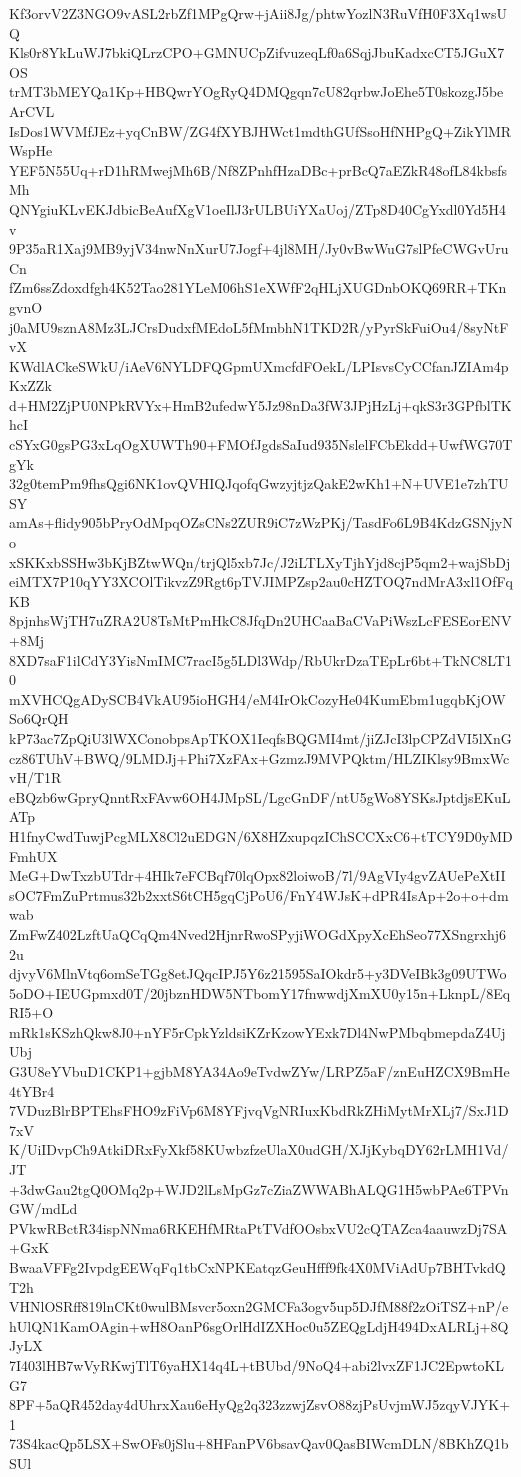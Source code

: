 Kf3orvV2Z3NGO9vASL2rbZf1MPgQrw+jAii8Jg/phtwYozlN3RuVfH0F3Xq1wsUQ
Kls0r8YkLuWJ7bkiQLrzCPO+GMNUCpZifvuzeqLf0a6SqjJbuKadxcCT5JGuX7OS
trMT3bMEYQa1Kp+HBQwrYOgRyQ4DMQgqn7cU82qrbwJoEhe5T0skozgJ5beArCVL
IsDos1WVMfJEz+yqCnBW/ZG4fXYBJHWct1mdthGUfSsoHfNHPgQ+ZikYlMRWspHe
YEF5N55Uq+rD1hRMwejMh6B/Nf8ZPnhfHzaDBc+prBcQ7aEZkR48ofL84kbsfsMh
QNYgiuKLvEKJdbicBeAufXgV1oeIlJ3rULBUiYXaUoj/ZTp8D40CgYxdl0Yd5H4v
9P35aR1Xaj9MB9yjV34nwNnXurU7Jogf+4jl8MH/Jy0vBwWuG7slPfeCWGvUruCn
fZm6ssZdoxdfgh4K52Tao281YLeM06hS1eXWfF2qHLjXUGDnbOKQ69RR+TKngvnO
j0aMU9sznA8Mz3LJCrsDudxfMEdoL5fMmbhN1TKD2R/yPyrSkFuiOu4/8syNtFvX
KWdlACkeSWkU/iAeV6NYLDFQGpmUXmcfdFOekL/LPIsvsCyCCfanJZIAm4pKxZZk
d+HM2ZjPU0NPkRVYx+HmB2ufedwY5Jz98nDa3fW3JPjHzLj+qkS3r3GPfblTKhcI
cSYxG0gsPG3xLqOgXUWTh90+FMOfJgdsSaIud935NslelFCbEkdd+UwfWG70TgYk
32g0temPm9fhsQgi6NK1ovQVHIQJqofqGwzyjtjzQakE2wKh1+N+UVE1e7zhTUSY
amAs+flidy905bPryOdMpqOZsCNs2ZUR9iC7zWzPKj/TasdFo6L9B4KdzGSNjyNo
xSKKxbSSHw3bKjBZtwWQn/trjQl5xb7Jc/J2iLTLXyTjhYjd8cjP5qm2+wajSbDj
eiMTX7P10qYY3XCOlTikvzZ9Rgt6pTVJIMPZsp2au0cHZTOQ7ndMrA3xl1OfFqKB
8pjnhsWjTH7uZRA2U8TsMtPmHkC8JfqDn2UHCaaBaCVaPiWszLcFESEorENV+8Mj
8XD7saF1ilCdY3YisNmIMC7racI5g5LDl3Wdp/RbUkrDzaTEpLr6bt+TkNC8LT10
mXVHCQgADySCB4VkAU95ioHGH4/eM4IrOkCozyHe04KumEbm1ugqbKjOWSo6QrQH
kP73ac7ZpQiU3lWXConobpsApTKOX1IeqfsBQGMI4mt/jiZJcI3lpCPZdVI5lXnG
cz86TUhV+BWQ/9LMDJj+Phi7XzFAx+GzmzJ9MVPQktm/HLZIKlsy9BmxWcvH/T1R
eBQzb6wGpryQnntRxFAvw6OH4JMpSL/LgcGnDF/ntU5gWo8YSKsJptdjsEKuLATp
H1fnyCwdTuwjPcgMLX8Cl2uEDGN/6X8HZxupqzIChSCCXxC6+tTCY9D0yMDFmhUX
MeG+DwTxzbUTdr+4HIk7eFCBqf70lqOpx82loiwoB/7l/9AgVIy4gvZAUePeXtII
sOC7FmZuPrtmus32b2xxtS6tCH5gqCjPoU6/FnY4WJsK+dPR4IsAp+2o+o+dmwab
ZmFwZ402LzftUaQCqQm4Nved2HjnrRwoSPyjiWOGdXpyXcEhSeo77XSngrxhj62u
djvyV6MlnVtq6omSeTGg8etJQqcIPJ5Y6z21595SaIOkdr5+y3DVeIBk3g09UTWo
5oDO+IEUGpmxd0T/20jbznHDW5NTbomY17fnwwdjXmXU0y15n+LknpL/8EqRI5+O
mRk1sKSzhQkw8J0+nYF5rCpkYzldsiKZrKzowYExk7Dl4NwPMbqbmepdaZ4UjUbj
G3U8eYVbuD1CKP1+gjbM8YA34Ao9eTvdwZYw/LRPZ5aF/znEuHZCX9BmHe4tYBr4
7VDuzBlrBPTEhsFHO9zFiVp6M8YFjvqVgNRIuxKbdRkZHiMytMrXLj7/SxJ1D7xV
K/UiIDvpCh9AtkiDRxFyXkf58KUwbzfzeUlaX0udGH/XJjKybqDY62rLMH1Vd/JT
+3dwGau2tgQ0OMq2p+WJD2lLsMpGz7cZiaZWWABhALQG1H5wbPAe6TPVnGW/mdLd
PVkwRBctR34ispNNma6RKEHfMRtaPtTVdfOOsbxVU2cQTAZca4aauwzDj7SA+GxK
BwaaVFFg2IvpdgEEWqFq1tbCxNPKEatqzGeuHfff9fk4X0MViAdUp7BHTvkdQT2h
VHNlOSRff819lnCKt0wulBMsvcr5oxn2GMCFa3ogv5up5DJfM88f2zOiTSZ+nP/e
hUlQN1KamOAgin+wH8OanP6sgOrlHdIZXHoc0u5ZEQgLdjH494DxALRLj+8QJyLX
7I403lHB7wVyRKwjTlT6yaHX14q4L+tBUbd/9NoQ4+abi2lvxZF1JC2EpwtoKLG7
8PF+5aQR452day4dUhrxXau6eHyQg2q323zzwjZsvO88zjPsUvjmWJ5zqyVJYK+1
73S4kacQp5LSX+SwOFs0jSlu+8HFanPV6bsavQav0QasBIWcmDLN/8BKhZQ1bSUl
